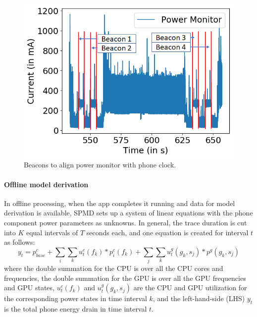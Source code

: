 \begin{figure}[tp]
{\small
    \centering
    \includegraphics[width=0.80\columnwidth]{figures/beacons_3.png}
    \vspace{-0.1in}
    \caption{Beacons to align power monitor with phone clock.}
    \label{fig:align_beacon}
    \vspace{-0.1in}
}
\end{figure}
\fi

\paragraph{Offline model derivation} 
%
In offline processing, \eg when the app completes it running and data for model derivation is available, SPMD sets up a system of linear equations with the phone component power parameters as unknowns.
In general, the trace duration is cut into $K$ equal intervals of $T$ seconds each, and one equation is created for interval $t$ as follows:
\begin{equation}
y_t = p^{c}_{base}+ \sum_i\sum_k{u^c_t(f_k)*p_i^{c}(f_{k})} + 
            \sum_{j}\sum_{k} u^g_t(g_k,s_j)*p^{g}(g_k, s_j)
\end{equation}
where the double summation for the CPU is over all the CPU cores and frequencies,
the double summation for the GPU is over all the GPU frequencies and GPU states,
$u^c_t(f_k)$ and $u^g_t(g_k,s_j)$ are the CPU and GPU utilization for the corresponding power states
in time interval $k$,
and the left-hand-side (LHS) $y_t$ is the total phone energy drain in time interval $t$.

